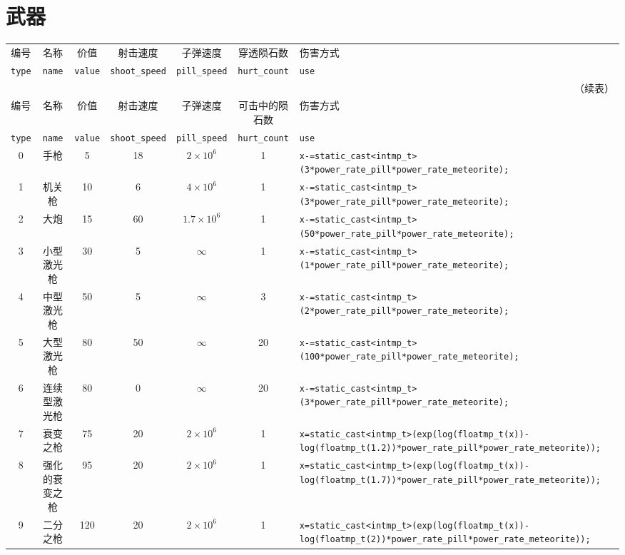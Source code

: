 \documentclass[UTF8,fontset=none,linespread=1.2]{ctexart}
\begin{document}
\section{武器}
\begin{center}
\begin{longtable}{|c|c|c|c|c|c|>{\centering\arraybackslash}m{10cm}|}
\hline
编号&名称&价值&射击速度&子弹速度&穿透陨石数&伤害方式\\
\lstinline|type|&\lstinline|name|&\lstinline|value|&\lstinline|shoot_speed|&\lstinline|pill_speed|&\lstinline|hurt_count|&\lstinline|use|\\\hline
\endfirsthead
\multicolumn{7}{r}{（续表）}\\\hline
编号&名称&价值&射击速度&子弹速度&可击中的陨石数&伤害方式\\
\lstinline|type|&\lstinline|name|&\lstinline|value|&\lstinline|shoot_speed|&\lstinline|pill_speed|&\lstinline|hurt_count|&\lstinline|use|\\\hline
\endhead
0&手枪&5&18&$2\times10^6$&1&\lstinline|x-=static_cast<intmp_t>(3*power_rate_pill*power_rate_meteorite);|\\\hline
1&机关枪&10&6&$4\times10^6$&1&\lstinline|x-=static_cast<intmp_t>(3*power_rate_pill*power_rate_meteorite);|\\\hline
2&大炮&15&60&$1.7\times10^6$&1&\lstinline|x-=static_cast<intmp_t>(50*power_rate_pill*power_rate_meteorite);|\\\hline
3&小型激光枪&30&5&$\infty$&1&\lstinline|x-=static_cast<intmp_t>(1*power_rate_pill*power_rate_meteorite);|\\\hline
4&中型激光枪&50&5&$\infty$&3&\lstinline|x-=static_cast<intmp_t>(2*power_rate_pill*power_rate_meteorite);|\\\hline
5&大型激光枪&80&50&$\infty$&20&\lstinline|x-=static_cast<intmp_t>(100*power_rate_pill*power_rate_meteorite);|\\\hline
6&连续型激光枪&80&0&$\infty$&20&\lstinline|x-=static_cast<intmp_t>(3*power_rate_pill*power_rate_meteorite);|\\\hline
7&衰变之枪&75&20&$2\times10^6$&1&\lstinline|x=static_cast<intmp_t>(exp(log(floatmp_t(x))-log(floatmp_t(1.2))*power_rate_pill*power_rate_meteorite));|\\\hline
8&强化的衰变之枪&95&20&$2\times10^6$&1&\lstinline|x=static_cast<intmp_t>(exp(log(floatmp_t(x))-log(floatmp_t(1.7))*power_rate_pill*power_rate_meteorite));|\\\hline
9&二分之枪&120&20&$2\times10^6$&1&\lstinline|x=static_cast<intmp_t>(exp(log(floatmp_t(x))-log(floatmp_t(2))*power_rate_pill*power_rate_meteorite));|\\\hline

\end{longtable}
\end{center}
\end{document}
